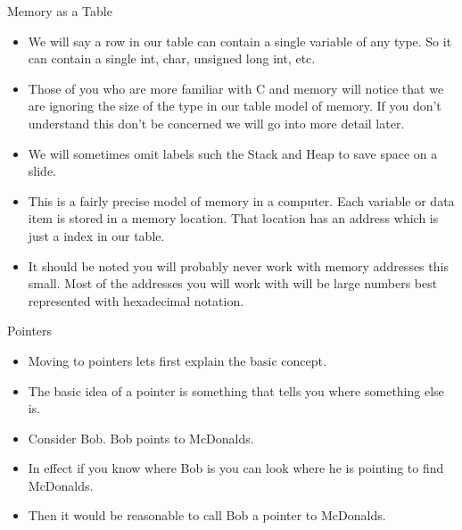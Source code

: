 \documentclass[10pt]{beamer}
\begin{document}
\begin{frame}{Memory as a Table}
	\begin{itemize}[<+->]
	\item We will say a row in our table can contain a single variable of any type. So it can contain a single int, char, unsigned long int, etc.

	\item Those of you who are more familiar with C and memory will notice that we are ignoring the size of the type in our table model of memory. If you don't understand this don't be concerned we will go into more detail later.

	\item We will sometimes omit labels such the Stack and Heap to save space on a slide.

	\item This is a fairly precise model of memory in a computer. Each variable or data item is stored in a memory location. That location has an address which is just a index in our table.

	\item It should be noted you will probably never work with memory addresses this small. Most of the addresses you will work with will be large numbers best represented with hexadecimal notation.
	\end{itemize}
\end{frame}


\begin{frame}[fragile]{Pointers}
	\begin{itemize}[<+->]
		\item Moving to pointers lets first explain the basic concept.
		\item The basic idea of a pointer is something that tells you where something else is.
		\item Consider Bob. Bob points to McDonalds. 
		\item In effect if you know where Bob is you can look where he is pointing to find McDonalds. \item Then it would be reasonable to call Bob a pointer to McDonalds.
	\end{itemize}
\end{frame}
\end{document}
